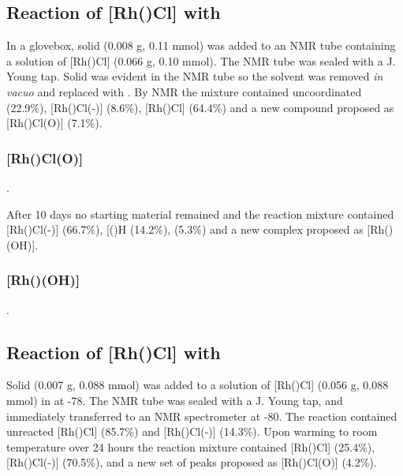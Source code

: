 \subsection*{Reaction of [Rh(\tButhixantphos)Cl] with \texorpdfstring{} O}

In a glovebox, solid  (0.008 g, 0.11 mmol) was added to an NMR tube containing a  solution of [Rh(\tButhixantphos)Cl] (0.066 g, 0.10 mmol).  The NMR tube was sealed with a J. Young tap.  Solid was evident in the NMR tube so the solvent was removed \emph{in vacuo} and replaced with .  By \phosphorus{} NMR the mixture contained uncoordinated \tButhixantphos{} (22.9\%), [Rh(\tButhixantphosk)Cl(-)] (8.6\%), [Rh(\tButhixantphosk)Cl] (64.4\%) and a new compound proposed as [Rh(\tButhixantphosk)Cl(O)] (7.1\%).

\subsubsection{[Rh(\tButhixantphosk)Cl(O)]}

.

After 10 days no starting material remained and the reaction mixture contained [Rh(\tButhixantphosk)Cl(-)] (66.7\%), [(\tButhixantphos)H\ce{]+} (14.2\%), \tButhixantphos{} (5.3\%) and a new complex proposed as [Rh(\tButhixantphos)(OH)].

\subsubsection{[Rh(\tButhixantphos)(OH)]}

.

\subsection*{Reaction of [Rh(\tBuxantphos)Cl] with \texorpdfstring{} O}

Solid  (0.007 g, 0.088 mmol) was added to a solution of [Rh(\tBuxantphos)Cl] (0.056 g, 0.088 mmol) in  at -78\degC{}.  The NMR tube was sealed with a J. Young tap, and immediately transferred to an NMR spectrometer at -80\degC.  The reaction contained unreacted [Rh(\tBuxantphos)Cl] (85.7\%) and [Rh(\tBuxantphos)Cl(-)] (14.3\%).  Upon warming to room temperature over 24 hours the reaction mixture contained [Rh(\tBuxantphos)Cl] (25.4\%), [Rh(\tBuxantphos)Cl(-)] (70.5\%), and a new set of peaks proposed as [Rh(\tBuxantphos)Cl(O)] (4.2\%).

